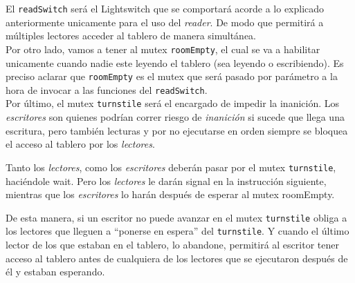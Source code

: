 El \texttt{readSwitch} ser\'a el Lightswitch que se comportar\'a acorde a lo explicado anteriormente unicamente para el uso del \textit{reader}. De modo que permitir\'a a m\'ultiples lectores acceder al tablero de manera simult\'anea.\\

Por otro lado, vamos a tener al mutex \texttt{roomEmpty}, el cual se va a habilitar unicamente cuando nadie este leyendo el tablero (sea leyendo o escribiendo). Es preciso aclarar que \texttt{roomEmpty} es el mutex que ser\'a pasado por par\'ametro a la hora de invocar a las funciones del \texttt{readSwitch}.\\

Por \'ultimo, el mutex \texttt{turnstile} ser\'a el encargado de impedir la inanici\'on. Los \textit{escritores} son quienes podr\'ian correr riesgo de \emph{inanici\'on} si sucede que llega una escritura, pero tambi\'en lecturas y por no ejecutarse en orden siempre se bloquea el acceso al tablero por los \textit{lectores}.

Tanto los \textit{lectores}, como los \textit{escritores} deber\'an pasar por el mutex \texttt{turnstile}, haci\'endole wait. Pero los \textit{lectores} le dar\'an signal en la instrucci\'on siguiente, mientras que los \textit{escritores} lo har\'an despu\'es de esperar al mutex roomEmpty.

De esta manera, si un escritor no puede avanzar en el mutex \texttt{turnstile} obliga a los lectores que lleguen a ``ponerse en espera'' del \texttt{turnstile}. Y cuando el \'ultimo lector de los que estaban en el tablero, lo abandone, permitir\'a al escritor tener acceso al tablero antes de cualquiera de los lectores que se ejecutaron despu\'es de \'el y estaban esperando.
